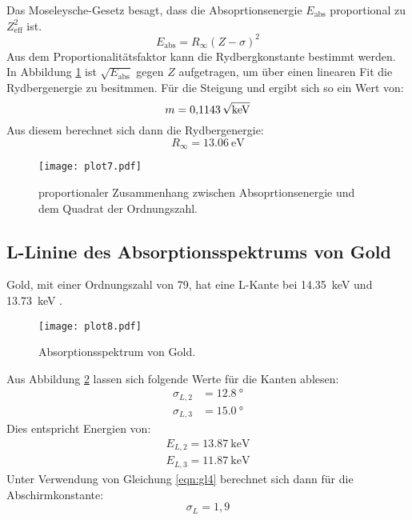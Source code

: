 Das Moseleysche-Gesetz besagt, dass die Absoprtionsenergie $E_\text{abs}$ proportional zu $Z_\text{eff}^2$ ist.
\begin{equation}
  E_\text{abs} = R_\infty (Z-\sigma)^2
\end{equation}
Aus dem Proportionalitätsfaktor kann die Rydbergkonstante bestimmt werden.
In Abbildung \ref{fig:plot7} ist $\sqrt{E_\text{abs}}$ gegen $Z$ aufgetragen, um über einen linearen Fit die Rydbergenergie zu besitmmen.
Für die Steigung und ergibt sich so ein Wert von:
\begin{equation*}
  m = \SI{0.1143}{\sqrt{\kilo\eV}}
\end{equation*}
Aus diesem berechnet sich dann die Rydbergenergie:
\begin{equation*}
  R_\infty = \SI{13.06}{\eV}
\end{equation*}
\begin{figure}
  \centering
  \texttt{[image: plot7.pdf]}
  \caption{proportionaler Zusammenhang zwischen Absoprtionsenergie und dem Quadrat der Ordnungszahl.}
  \label{fig:plot7}
\end{figure}
\FloatBarrier

\subsection{L-Linine des Absorptionsspektrums von Gold}

Gold, mit einer Ordnungszahl von 79, hat eine L-Kante bei \SI{14.35}{\kilo\eV} und \SI{13.73}{\kilo\eV} \cite{Periode}.
\begin{figure}
  \centering
  \texttt{[image: plot8.pdf]}
  \caption{Absorptionsspektrum von Gold.}
  \label{fig:plot8}
\end{figure}
Aus Abbildung \ref{fig:plot8} lassen sich folgende Werte für die Kanten ablesen:
\begin{align*}
  \sigma_{L,2} &= \SI{12.8}{\degree}\\
  \sigma_{L,3} &= \SI{15.0}{\degree}
\end{align*}
Dies entspricht Energien von:
\begin{align*}
  E_{L,2} = \SI{13.87}{\kilo\eV} \\
  E_{L,3} = \SI{11,87}{\kilo\eV}
\end{align*}
Unter Verwendung von Gleichung \eqref{eqn:gl4} berechnet sich dann für die Abschirmkonstante:
\begin{equation*}
  \sigma_L = 1,9
\end{equation*}
